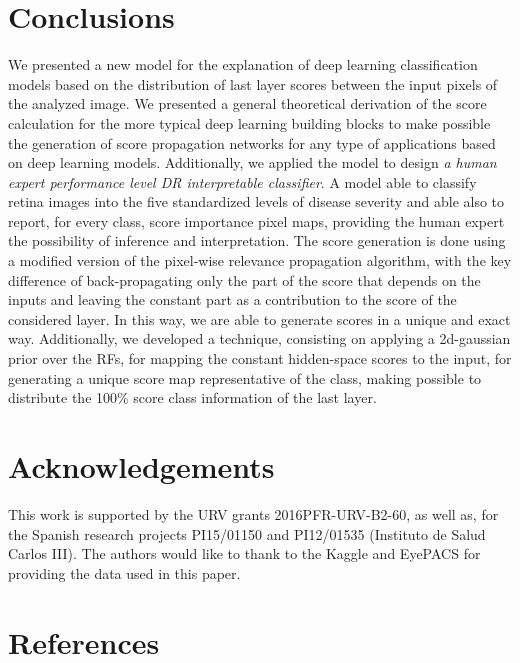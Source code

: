 \documentclass[preprint]{elsarticle}
\theoremstyle{definition} %
\theoremstyle{remark}
\begin{document}
\section{Conclusions}\label{sec:conclusions}

We presented a new model for the explanation of deep learning classification models based on the distribution of last layer scores between the input pixels of the analyzed image. We presented a general theoretical derivation of the score calculation for the more typical deep learning building blocks to make possible the generation of score propagation networks for any type of applications based on deep learning models.  Additionally, we applied the model to design \emph{a human expert performance level DR interpretable classifier}. A model able to classify retina images into the five standardized levels of disease severity and able also to report, for every class, score importance pixel maps, providing the human expert the possibility of inference and interpretation. The score generation is done using a modified version of the pixel-wise relevance propagation algorithm, with the key difference of back-propagating only the part of the score that depends on the inputs and leaving the constant part as a contribution to the score of the considered layer. In this way, we are able to generate scores in a unique and exact way. Additionally, we developed a technique, consisting on applying a 2d-gaussian prior over the RFs, for mapping the constant hidden-space scores to the input, for generating a unique score map representative of the class, making possible to distribute the 100\% score class information of the last layer. 

\section*{Acknowledgements}
This work is supported by the URV grants 2016PFR-URV-B2-60, as well as, for the Spanish research projects PI15/01150 and PI12/01535 (Instituto de Salud Carlos III). The authors would like to thank to the Kaggle and EyePACS for providing the data used in this paper.

\section*{References}


\end{document}
